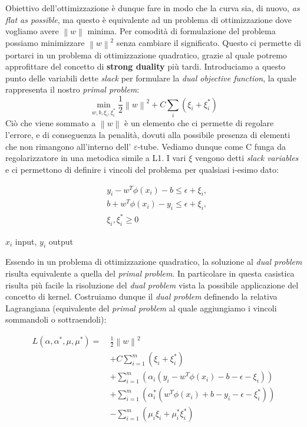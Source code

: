 \documentclass[12pt]{article}
\newcommand{\norm}[1]{\left\lVert#1\right\rVert}
\begin{document}
Obiettivo dell’ottimizzazione è dunque fare in modo che la curva sia, di nuovo, \textit{as flat as possible}, ma questo è equivalente ad un problema di ottimizzazione dove vogliamo avere $\norm{w}$ minima. 
Per comodità di formulazione del problema possiamo minimizzare $\norm{w}^2$ senza cambiare il significato. Questo ci permette di portarci in un problema di ottimizzazione quadratico, grazie al quale potremo approfittare del concetto di \textbf{strong duality} più tardi. 
Introduciamo a questo punto delle variabili dette \textit{slack} per formulare la \textit{dual objective function}, la quale rappresenta il nostro \textit{primal problem}:
	\begin{equation}\label{eq:1}
		\min_{w,b,\xi_i,\xi_i^*} \frac{1}{2}\norm{w}^2+C\sum_{i}(\xi_{i} + \xi_{i}^*)
	\end{equation}
	Ciò che viene sommato a $\norm{w}$ è un elemento che ci permette di regolare l’errore, e di conseguenza la penalità, dovuti alla possibile presenza di elementi che non rimangono all’interno dell’ $\varepsilon$-tube. Vediamo dunque come C funga da regolarizzatore in una metodica simile a L1. I vari $\xi$ vengono detti \textit{slack variables} e ci permettono di definire i vincoli del problema per qualsiasi i-esimo dato:

	\begin{equation}\label{eq:2}
	\begin{aligned}
		&y_i - w^T\phi(x_i) - b \leq \epsilon + \xi_i,  \\ 
		&b + w^T\phi(x_i) - y_i \leq \epsilon + \xi_i, \\
		&\xi_i,\xi_i^*  \geq 0
	\end{aligned}
	\end{equation}

	\begin{center}
		\footnotesize{$x_i$ input, $y_i$ output}
	\end{center}
	
	Essendo in un problema di ottimizzazione quadratico, la soluzione al \textit{dual problem} risulta equivalente a quella del \textit{primal problem}. In particolare in questa casistica risulta più facile la risoluzione del \textit{dual problem} vista la possibile applicazione del concetto di kernel. Costruiamo dunque il \textit{dual problem} definendo la relativa Lagrangiana (equivalente del \textit{primal problem} al quale aggiungiamo i vincoli sommandoli o sottraendoli):
	

	\begin{equation}\label{eq:3}
	\begin{aligned}
		L(\alpha,\alpha^*,\mu,\mu^*) =  \ &\frac{1}{2}\norm{w}^2\\
		&+C\sum_{i=1}^{m}(\xi_{i} + \xi_{i}^*) \\
		&+ \sum_{i=1}^{m}(\alpha_i(y_i - w^T\phi(x_i) - b - \epsilon - \xi_i))\\
		&+ \sum_{i=1}^{m}(\alpha_i^*(w^T\phi(x_i) + b - y_i - \epsilon - \xi_i^*)) \\
		&- \sum_{i=1}^{m}(\mu_i\xi_i + \mu_i^*\xi_i^*)
	\end{aligned}
	\end{equation}
\end{document}
